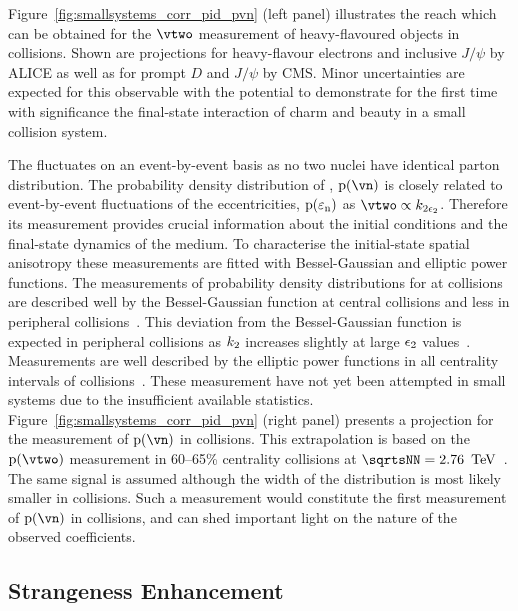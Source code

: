 \documentclass[../report.tex]{subfiles}
\begin{document}
Figure~\ref{fig:smallsystems_corr_pid_pvn} (left panel) illustrates the reach which can be obtained for the $\vtwo$ measurement of heavy-flavoured objects in \pPb collisions. Shown are projections for heavy-flavour electrons and inclusive $J/\psi$ by ALICE as well as for prompt $D$ and $J/\psi$ by CMS. Minor uncertainties are expected for this observable with the potential to demonstrate for the first time with significance the final-state interaction of charm and beauty in a small collision system.

The \vn fluctuates on an event-by-event basis as no two nuclei have identical parton distribution. The probability density distribution of \vn, ${\rm p}(\vn)$ is closely related to event-by-event fluctuations of the eccentricities, ${\rm p}(\varepsilon_{\rm{n}})$ as $\vtwo \propto k_{\rm{2}\epsilon_{\rm{2}}}$. Therefore its measurement provides crucial information about the initial conditions and the final-state dynamics of the medium. To characterise the initial-state spatial anisotropy these measurements are fitted with Bessel-Gaussian and elliptic power functions. The measurements of probability density distributions for \vtwo at \PbPb collisions are described well by the Bessel-Gaussian function at central collisions and less in peripheral collisions~\cite{Aad:2013xma,Sirunyan:2017fts}. This deviation from the Bessel-Gaussian function is expected in peripheral collisions as $k_{\rm{2}}$ increases slightly at large $\epsilon_{\rm{2}}$ values~\cite{Jia:2014jca}. Measurements are well described by the elliptic power functions in all centrality intervals of \PbPb collisions~\cite{Sirunyan:2017fts}. These measurement have not yet been attempted in small systems due to the insufficient available statistics. Figure~\ref{fig:smallsystems_corr_pid_pvn} (right panel) presents a projection for the measurement of ${\rm p}(\vn)$ in \pp collisions. This extrapolation is based on the ${\rm p}(\vtwo)$ measurement in 60--65\% centrality \PbPb collisions at $\sqrtsNN = \unit[2.76]{\UTeV}$~\cite{Aad:2013xma}. The same signal is assumed although the width of the distribution is most likely smaller in \pp collisions. Such a measurement would constitute the first measurement of ${\rm p}(\vn)$ in \pp collisions, and can shed important light on the nature of the observed \vtwo coefficients.


\subsection{Strangeness Enhancement}
\label{sect:smallsystems_strangeness}
\end{document}
